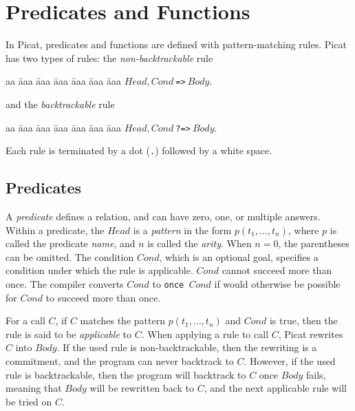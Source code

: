 \chapter{\label{chapter:predicates}Predicates and Functions}
In Picat, predicates and functions are defined with pattern-matching rules. Picat has two types of rules: the \emph{non-backtrackable} rule 
\begin{tabbing}
aa \= aaa \= aaa \= aaa \= aaa \= aaa \= aaa \kill
\> \> $Head, Cond\ $\verb+=>+$\ Body$. 
\end{tabbing}
and the \emph{backtrackable} rule 
\begin{tabbing}
aa \= aaa \= aaa \= aaa \= aaa \= aaa \= aaa \kill
\> \> $Head, Cond\ $\verb+?=>+$\ Body$. 
\end{tabbing}
Each rule is terminated by a dot (\verb+.+) followed by a white space. 

\section{Predicates}
A \emph{predicate} defines a relation, and can have zero, one, or multiple answers. Within a predicate, the $Head$ is a \emph{pattern} in the form $p(t_1,\ldots,t_n)$, where $p$ is called the predicate \emph{name}, and $n$ is called the \emph{arity}. When $n=0$, the parentheses can be omitted. The condition $Cond$, which is an optional goal, specifies a condition under which the rule is applicable. $Cond$ cannot succeed more than once. The compiler converts $Cond$ to \texttt{once $Cond$} if would otherwise be possible for $Cond$ to succeed more than once.

For a call $C$, if $C$ matches the pattern $p(t_1,\ldots,t_n)$ and $Cond$ is true, then the rule is said to be \emph{applicable} to $C$. When applying a rule to call $C$, Picat rewrites $C$ into $Body$. If the used rule is non-backtrackable, then the rewriting is a commitment, and the program can never backtrack to $C$. However, if the used rule is backtrackable, then the program will backtrack to $C$ once $Body$ fails, meaning that $Body$ will be rewritten back to $C$, and the next applicable rule will be tried on $C$. 

